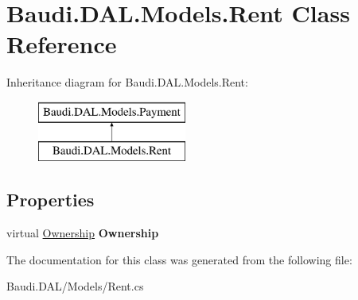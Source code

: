 \hypertarget{class_baudi_1_1_d_a_l_1_1_models_1_1_rent}{}\section{Baudi.\+D\+A\+L.\+Models.\+Rent Class Reference}
\label{class_baudi_1_1_d_a_l_1_1_models_1_1_rent}
Inheritance diagram for Baudi.\+D\+A\+L.\+Models.\+Rent\+:\begin{figure}[H]
\begin{center}
\leavevmode
\includegraphics[height=2.000000cm]{class_baudi_1_1_d_a_l_1_1_models_1_1_rent}
\end{center}
\end{figure}
\subsection*{Properties}
\begin{DoxyCompactItemize}
\item 
\hypertarget{class_baudi_1_1_d_a_l_1_1_models_1_1_rent_a674a037cf4fbdc68fc8e9563706949d8}{}virtual \hyperlink{class_baudi_1_1_d_a_l_1_1_models_1_1_ownership}{Ownership} {\bfseries Ownership}\label{class_baudi_1_1_d_a_l_1_1_models_1_1_rent_a674a037cf4fbdc68fc8e9563706949d8}

\end{DoxyCompactItemize}


The documentation for this class was generated from the following file\+:\begin{DoxyCompactItemize}
\item 
Baudi.\+D\+A\+L/\+Models/Rent.\+cs\end{DoxyCompactItemize}
